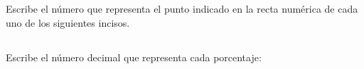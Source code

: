 \documentclass[12pt,addpoints]{evalua}
\begin{document}
\begin{questions}
    \section*{\else{}\fi}

    \subsection*{\else{}\fi}

    \question[4] Escribe el número que representa el punto indicado en la recta numérica de cada uno de los siguientes incisos.

    \begin{multicols}{2}
    \end{multicols}

    \subsection*{\else{}\fi}

    \question[4] Escribe el número decimal que representa cada porcentaje:

    \begin{multicols}{2}
        \begin{parts}

\end{parts}
\end{multicols}
\end{questions}
\end{document}

